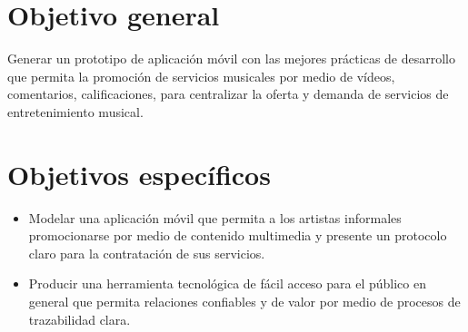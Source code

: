 \section{Objetivo general}
Generar un prototipo de aplicación móvil con las mejores prácticas de desarrollo que permita la promoción de servicios musicales por medio de vídeos, comentarios, calificaciones, para centralizar la oferta y demanda de servicios de entretenimiento musical.
\section{Objetivos específicos}
\begin{itemize}
  \item Modelar una aplicación móvil que permita a los artistas informales  promocionarse por medio de contenido multimedia y presente un protocolo claro para la contratación de sus servicios.
  
  \item Producir una herramienta tecnológica de fácil acceso para el público en general que permita relaciones confiables y de valor por medio de procesos de trazabilidad clara.

\end{itemize}